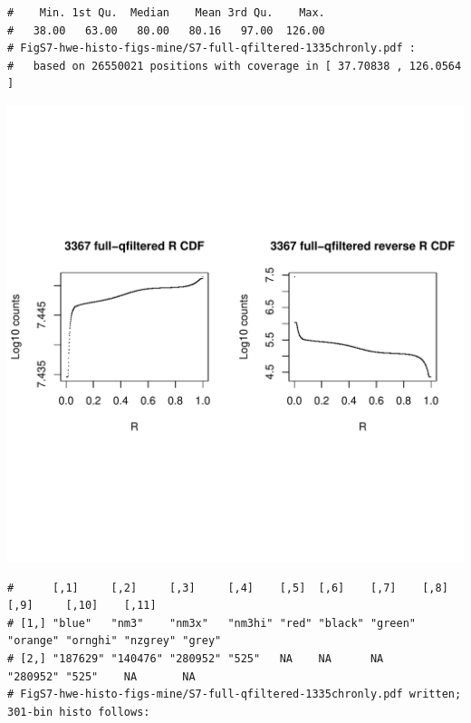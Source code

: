 \documentclass{article}\usepackage[]{graphicx}\usepackage[]{color}
\makeatletter
\def\maxwidth{ %
  \ifdim\Gin@nat@width>\linewidth
    \linewidth
  \else
    \Gin@nat@width
  \fi
}
\newenvironment{kframe}{%
 \def\at@end@of@kframe{}%
 \ifinner\ifhmode%
  \def\at@end@of@kframe{\end{minipage}}%
  \begin{minipage}{\columnwidth}%
 \fi\fi%
 \def\FrameCommand##1{\hskip\@totalleftmargin \hskip-\fboxsep
 \colorbox{shadecolor}{##1}\hskip-\fboxsep
     \hskip-\linewidth \hskip-\@totalleftmargin \hskip\columnwidth}%
 \MakeFramed {\advance\hsize-\width
   \@totalleftmargin\z@ \linewidth\hsize
   \@setminipage}}%
 {\par\unskip\endMakeFramed%
 \at@end@of@kframe}
\newenvironment{knitrout}{}{} %
\makeatother
\begin{document}
\begin{knitrout}
\begin{kframe}
\begin{verbatim}
#    Min. 1st Qu.  Median    Mean 3rd Qu.    Max. 
#   38.00   63.00   80.00   80.16   97.00  126.00 
# FigS7-hwe-histo-figs-mine/S7-full-qfiltered-1335chronly.pdf :
#   based on 26550021 positions with coverage in [ 37.70838 , 126.0564 ]
\end{verbatim}
\end{kframe}
\includegraphics[width=\maxwidth]{FigS7-hwe-histo-figs-knitr/unnamed-chunk-10-40} 
\begin{kframe}\begin{verbatim}
#      [,1]     [,2]     [,3]     [,4]    [,5]  [,6]    [,7]    [,8]     [,9]     [,10]    [,11] 
# [1,] "blue"   "nm3"    "nm3x"   "nm3hi" "red" "black" "green" "orange" "ornghi" "nzgrey" "grey"
# [2,] "187629" "140476" "280952" "525"   NA    NA      NA      "280952" "525"    NA       NA    
# FigS7-hwe-histo-figs-mine/S7-full-qfiltered-1335chronly.pdf written; 301-bin histo follows:
\end{verbatim}
\end{kframe}

\end{knitrout}
\end{document}
